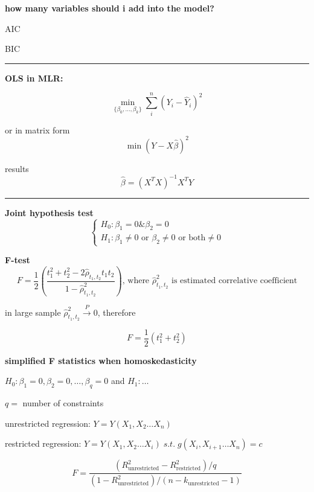 \documentclass{article}
\newcommand*\sepline{%
  \begin{center}
    \rule[1ex]{.5\textwidth}{.5pt}
  \end{center}}
\begin{document}
\textbf{how many variables should i add into the model?}

AIC

BIC

\sepline

\textbf{OLS in MLR:}

\begin{equation}
  \min\limits_{\{\beta_0,\dots,\beta_k\}} \sum\limits_i^n (Y_i-\hat Y_i)^2
\end{equation}

or in matrix form
\begin{equation}
  \min (Y-X \hat{\beta} )^2
\end{equation}

results
\begin{equation}
  \hat{\beta}=(X^T X)^{-1}X^T Y
\end{equation}

\sepline

\textbf{Joint hypothesis test}
\begin{equation}
  \begin{cases}
    H_0: \beta_1=0 \& \beta_2=0
    \\
    H_1: \beta_1\neq 0 \text{ or } \beta_2\neq 0\text{ or both} \neq 0 
  \end{cases}
\end{equation}


\textbf{F-test}
\begin{equation}
  F=\frac{1}{2}(\frac{t_1^2+t_2^2-2 \hat \rho_{t_1,t_2} t_1 t_2 }{1-\hat \rho_{t_1,t_2}^2}) \text{, where $\hat\rho_{t_1,t_2}^2$ is estimated correlative coefficient}
\end{equation}

in large sample $\hat\rho_{t_1,t_2}^2 \stackrel{P}{\rightarrow} 0$, therefore

\begin{equation}
  F=\frac{1}{2}(t_1^2+t_2^2)
\end{equation}

\textbf{simplified F statistics when homoskedasticity}

$H_0: \beta_1=0,\beta_2=0,\dots,\beta_q=0$ and $H_1: \dots$

$q=$ number of constraints

unrestricted regression: $Y=Y(X_1,X_2\dots X_n)$

restricted regression: $Y=Y(X_1,X_2\dots X_i) \;s.t. \; g(X_i,X_{i+1}\dots X_n)=c$

\begin{equation}
  F=
  \frac{(R^2_{\text{unrestricted}}-R^2_{\text{restricted}})/q}{(1-R^2_{\text{unrestricted}})/(n-k_{\text{unrestricted}}-1)}
\end{equation}
\end{document}
